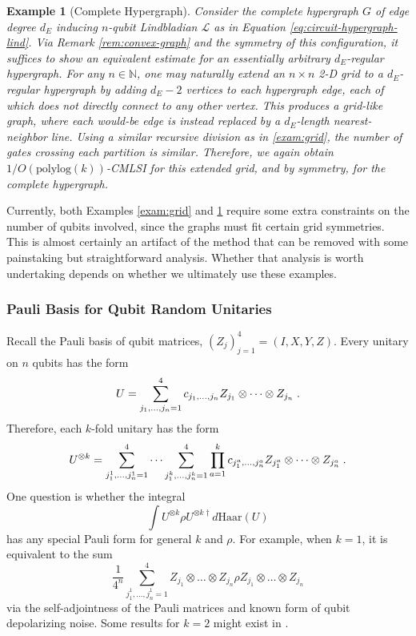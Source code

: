 \documentclass[11pt,reqno]{amsart}
\newtheorem{exam}[lemma]{Example}
\newcommand{\NN}{\mathbb{N}}
\newcommand{\pl}{\hspace{.1cm}}
\renewcommand{\L}{\mathcal{L}}
\begin{document}
\begin{exam}[Complete Hypergraph] \normalfont \label{exam:complete-hyper}
    Consider the complete hypergraph $G$ of edge degree $d_E$ inducing $n$-qubit Lindbladian $\L$ as in Equation \eqref{eq:circuit-hypergraph-lind}. Via Remark \ref{rem:convex-graph} and the symmetry of this configuration, it suffices to show an equivalent estimate for an essentially arbitrary $d_E$-regular hypergraph. For any $n \in \NN$, one may naturally extend an $n \times n$ 2-D grid to a $d_E$-regular hypergraph by adding $d_E - 2$ vertices to each hypergraph edge, each of which does not directly connect to any other vertex. This produces a grid-like graph, where each would-be edge is instead replaced by a $d_E$-length nearest-neighbor line. Using a similar recursive division as in \ref{exam:grid}, the number of gates crossing each partition is similar. Therefore, we again obtain $1/O(\mathrm{polylog}(k))$-CMLSI for this extended grid, and by symmetry, for the complete hypergraph.
\end{exam}
Currently, both Examples \ref{exam:grid} and \ref{exam:complete-hyper} require some extra constraints on the number of qubits involved, since the graphs must fit certain grid symmetries. This is almost certainly an artifact of the method that can be removed with some painstaking but straightforward analysis. Whether that analysis is worth undertaking depends on whether we ultimately use these examples.



\subsubsection{Pauli Basis for Qubit Random Unitaries}

Recall the Pauli basis of qubit matrices, $(Z_j)_{j=1}^4 = (I, X, Y, Z)$. Every unitary on $n$ qubits has the form
\begin{equation}
    U = \sum_{j_1, \dots, j_n = 1}^4 c_{j_1, \dots, j_n} Z_{j_1} \otimes \dots \otimes Z_{j_n} \pl.
\end{equation}
Therefore, each $k$-fold unitary has the form
\begin{equation}
    U^{\otimes k} = \sum_{j^1_1, \dots, j^1_n = 1}^4 \dots \sum_{j^k_1, \dots, j^k_n = 1}^4 \prod_{a=1}^k c_{j^a_1, \dots, j^a_n} Z_{j^a_1} \otimes \dots \otimes Z_{j^a_n} \pl.
\end{equation}
One question is whether the integral
\begin{equation}
    \int U^{\otimes k} \rho U^{\otimes k \dagger} d\mathrm{Haar}(U)
\end{equation}
has any special Pauli form for general $k$ and $\rho$. For example, when $k=1$, it is equivalent to the sum
\begin{equation}
    \frac{1}{4^n} \sum_{j^1_1, \dots, j^1_n = 1}^4 Z_{j_1} \otimes \dots \otimes Z_{j_n} \rho Z_{j_1} \otimes \dots \otimes Z_{j_n}
\end{equation}
via the self-adjointness of the Pauli matrices and known form of qubit depolarizing noise. Some results for $k=2$ might exist in \cite[Supplemental Material]{angrisani_classically_2025}.
\end{document}
